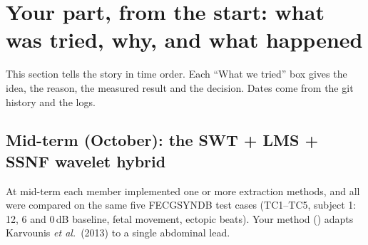 \documentclass[11pt]{article}
\begin{document}
\section{Your part, from the start: what was tried, why, and what happened}
This section tells the story in time order. Each ``What we tried'' box gives the idea, the reason, the measured result and the decision. Dates come from the git history and the logs.

\begin{center}
\end{center}

\subsection{Mid-term (October): the SWT + LMS + SSNF wavelet hybrid}
At mid-term each member implemented one or more extraction methods, and all were compared on the same five FECGSYNDB test cases (TC1--TC5, subject 1: 12, 6 and 0\,dB baseline, fetal movement, ectopic beats). Your method () adapts Karvounis \emph{et al.}\ (2013) to a single abdominal lead.
\end{document}
